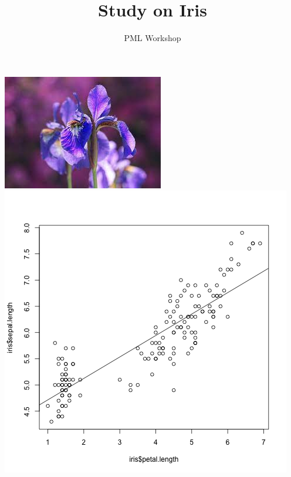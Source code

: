 \documentclass{article}
\title{Study on Iris}
\author{PML Workshop}
\begin{document}
\begin{titlingpage}
    \maketitle
    \centering
    \includegraphics[width=\textwidth]{./iris.png}
    \centering
    \includegraphics[width=\textwidth]{./lm_result.png}
\end{titlingpage}
\blinddocument
\end{document}
